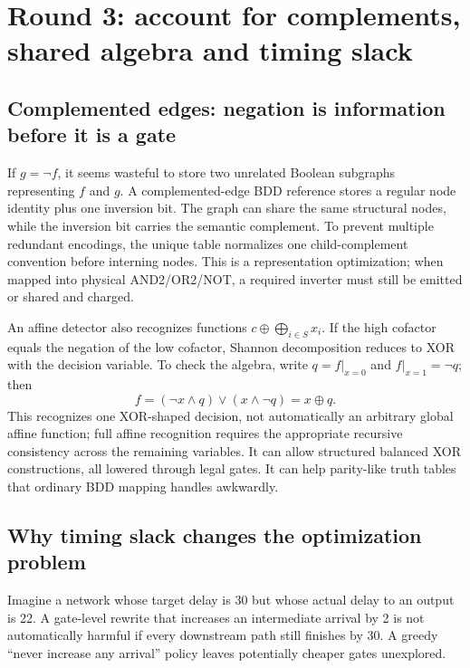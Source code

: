 \section{Round 3: account for complements, shared algebra and timing slack}
\subsection{Complemented edges: negation is information before it is a gate}
If $g=\neg f$, it seems wasteful to store two unrelated Boolean subgraphs representing $f$ and $g$. A complemented-edge BDD reference stores a regular node identity plus one inversion bit. The graph can share the same structural nodes, while the inversion bit carries the semantic complement. To prevent multiple redundant encodings, the unique table normalizes one child-complement convention before interning nodes. This is a representation optimization; when mapped into physical AND2/OR2/NOT, a required inverter must still be emitted or shared and charged.

An affine detector also recognizes functions $c\oplus\bigoplus_{i\in S}x_i$. If the high cofactor equals the negation of the low cofactor, Shannon decomposition reduces to XOR with the decision variable. To check the algebra, write $q=f|_{x=0}$ and $f|_{x=1}=\neg q$; then
\[
 f=(\neg x\land q)\lor(x\land\neg q)=x\oplus q.
\]
This recognizes one XOR-shaped decision, not automatically an arbitrary global affine function; full affine recognition requires the appropriate recursive consistency across the remaining variables. It can allow structured balanced XOR constructions, all lowered through legal gates. It can help parity-like truth tables that ordinary BDD mapping handles awkwardly.

\subsection{Why timing slack changes the optimization problem}
Imagine a network whose target delay is 30 but whose actual delay to an output is 22. A gate-level rewrite that increases an intermediate arrival by 2 is not automatically harmful if every downstream path still finishes by 30. A greedy ``never increase any arrival'' policy leaves potentially cheaper gates unexplored.

